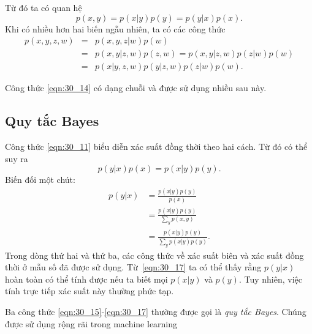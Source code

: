 Từ đó ta có quan hệ
\begin{equation}
    \label{eqn:30_11}
    p(x, y) = p(x|y)p(y) = p(y | x) p(x).
\end{equation}
Khi có nhiều hơn hai biến ngẫu nhiên, ta có các công thức
\begin{eqnarray}
    \label{eqn:30_12}
  p(x, y, z, w)
  & = & p(x, y, z | w) p(w) \\
    \label{eqn:30_13}
  & = & p(x, y | z, w)p(z, w) = p(x, y | z, w) p(z | w) p(w) \\
    \label{eqn:30_14}
  & = & p(x | y, z, w)p(y | z, w) p(z | w) p(w).
\end{eqnarray}

Công thức \eqref{eqn:30_14} có dạng {chuỗi} và được sử dụng nhiều sau
này.


\subsection{Quy tắc Bayes}
Công thức \eqref{eqn:30_11} biểu diễn xác suất đồng thời theo hai cách. Từ đó có thể suy ra
\begin{equation}
  p(y |x) p(x) = p(x | y) p(y).
\end{equation}
Biến đối một chút:
\begin{align}
\label{eqn:30_15}
  p(y | x)
  & =  \frac{p(x |y) p(y)}{p(x)} \\
\label{eqn:30_16}
  & =  \frac{p(x |y) p(y)}{\sum \limits_{y} p(x, y)} \\
\label{eqn:30_17}
  & =  \frac{p(x |y) p(y)}{\sum \limits_{y} p(x | y) p(y)}.
\end{align}
Trong dòng thứ hai và thứ ba, các công thức về xác suất biên và xác suất đồng thời
ở mẫu số đã được sử dụng. Từ~\eqref{eqn:30_17} ta có thể thấy rằng $p(y | x)$
hoàn toàn có thể tính được nếu ta biết mọi $p(x | y)$ và $p(y)$. Tuy nhiên, việc
tính trực tiếp xác suất này thường phức tạp.


{Ba công thức \eqref{eqn:30_15}-\eqref{eqn:30_17} thường được gọi là \textit{quy
tắc Bayes}. Chúng được sử dụng rộng rãi trong machine learning}


